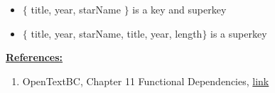 \documentclass[12pt]{article}
\begin{document}
\begin{enumerate}[1.]
\begin{itemize}
\begin{itemize}
\begin{itemize}
                \begin{itemize}
                    \item $\{$ title, year, starName $\}$ is a key and superkey
                    \item $\{$ title, year, starName, title, year, length$\}$ is a superkey
                \end{itemize}
            \end{itemize}
        \end{itemize}
    \end{itemize}


    \bigskip

    \underline{\textbf{References:}}

    \bigskip

    \begin{enumerate}[1)]
        \item OpenTextBC, Chapter 11 Functional Dependencies, \href{https://opentextbc.ca/dbdesign01/chapter/chapter-11-functional-dependencies/#:~:text=A%20functional%20dependency%20(FD)%20is,determines%20the%20value%20of%20Y.}{link}
    \end{enumerate}
\end{enumerate}
\end{document}
